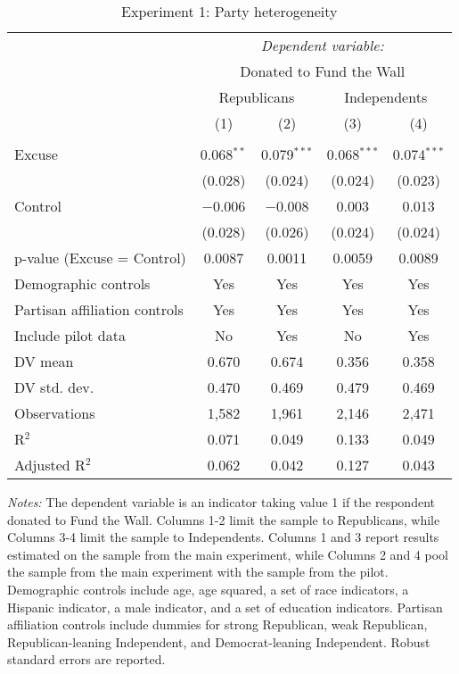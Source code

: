 
\begin{table}[!htbp] \centering 
  \caption{Experiment 1: Party heterogeneity} 
  \label{t:2-partyheterogeneity} 
\begin{threeparttable}
\begin{tabular}{@{\hspace{5pt}}l@{\hspace{5pt}}cccc} 
\toprule 
 & \multicolumn{4}{c}{\textit{Dependent variable:}} \\ 
\cmidrule(rr){2-5} 
 & \multicolumn{4}{c}{Donated to Fund the Wall} \\ 
 \cmidrule(rr){2-5}
 & \multicolumn{2}{c}{Republicans} & \multicolumn{2}{c}{Independents} \\ 
 & (1) & (2) & (3) & (4)\\ 
\midrule  
\\[-2.1ex] Excuse & 0.068$^{**}$ & 0.079$^{***}$ & 0.068$^{***}$ & 0.074$^{***}$ \\ 
  & (0.028) & (0.024) & (0.024) & (0.023) \\ 
 \addlinespace 
 Control & $-$0.006 & $-$0.008 & 0.003 & 0.013 \\ 
  & (0.028) & (0.026) & (0.024) & (0.024) \\ 
 \addlinespace 
p-value (Excuse = Control) & 0.0087 & 0.0011 & 0.0059 & 0.0089 \\ 
\midrule  
Demographic controls & Yes & Yes & Yes & Yes \\ 
Partisan affiliation controls & Yes & Yes & Yes & Yes \\ 
\midrule
Include pilot data & No & Yes & No & Yes \\
\addlinespace
DV mean & 0.670 & 0.674 & 0.356 & 0.358 \\
DV std. dev. & 0.470 & 0.469 & 0.479 & 0.469 \\
Observations & 1,582 & 1,961 & 2,146 & 2,471 \\ 
R$^{2}$ & 0.071 & 0.049 & 0.133 & 0.049 \\ 
Adjusted R$^{2}$ & 0.062 & 0.042 & 0.127 & 0.043 \\ 
\bottomrule 
\end{tabular} 
\begin{tablenotes}
\footnotesize
\item \textit{Notes:} The dependent variable is an indicator taking value 1 if the respondent donated to Fund the Wall. Columns 1-2 limit the sample to Republicans, while Columns 3-4 limit the sample to Independents. Columns 1 and 3 report results estimated on the sample from the main experiment, while Columns 2 and 4 pool the sample from the main experiment with the sample from the pilot. Demographic controls include age, age squared, a set of race indicators, a Hispanic indicator, a male indicator, and a set of education indicators. Partisan affiliation controls include dummies for strong Republican, weak Republican, Republican-leaning Independent, and Democrat-leaning Independent. Robust standard errors are reported.
\end{tablenotes}
\end{threeparttable}
\end{table} 
